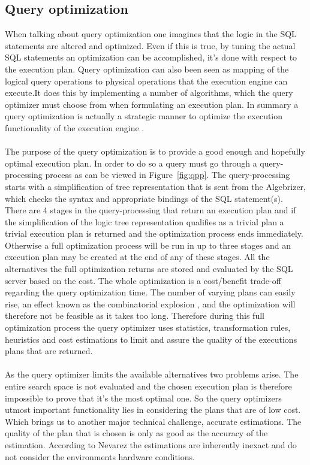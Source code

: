 \documentclass{cslthse-msc}
\begin{document}
\subsection{Query optimization}
When talking about query optimization one imagines that the logic in the SQL statements are altered and optimized. Even if this is true, by tuning the actual SQL statements an optimization can be accomplished, it's done with respect to the execution plan. Query optimization can also been seen as mapping of the logical query operations to physical operations that the execution engine can execute.It does this by implementing a number of algorithms, which the query optimizer must choose from when formulating an execution plan. In summary a query optimization is actually a strategic manner to optimize the execution functionality of the execution engine \cite{Nevarez}. \\\\ 
The purpose of the query optimization is to provide a good enough and hopefully optimal execution plan. In order to do so a query must go through a query-processing process as can be viewed in Figure~\ref{fig:qpp}. The query-processing starts with a simplification of tree representation that is sent from the Algebrizer, which checks the syntax and appropriate bindings of the SQL statement(s). There are 4 stages in the query-processing that return an execution plan and if the simplification of the logic tree representation qualifies as a trivial plan a trivial execution plan is returned and the optimization process ends immediately. Otherwise a full optimization process will be run in up to three stages and an execution plan may be created at the end of any of these stages. All the alternatives the full optimization returns are stored and evaluated by the SQL server based on the cost. The whole optimization is a cost/benefit trade-off regarding the query optimization time. The number of varying plans can easily rise, an effect known as the combinatorial explosion \cite{combo}, and the optimization will therefore not be feasible as it takes too long. Therefore during this full optimization process the query optimizer uses statistics, transformation rules, heuristics and cost estimations to limit and assure the quality of the executions plans that are returned.\\\\ 
As the query optimizer limits the available alternatives two problems arise. The entire search space is not evaluated and the chosen execution plan is therefore impossible to prove that it's the most optimal one. So the query optimizers utmost important functionality lies in considering the plans that are of low cost. Which brings us to another major technical challenge, accurate estimations. The quality of the plan that is chosen is only as good as the accuracy of the estimation. According to Nevarez \cite{Nevarez} the estimations are inherently inexact and do not consider the environments hardware conditions.
\end{document}
